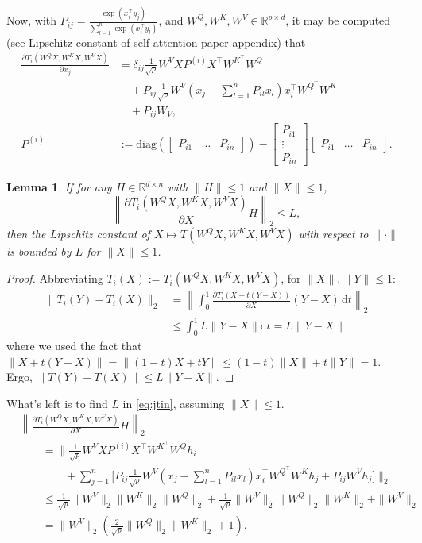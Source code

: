 \documentclass{article}
\newtheorem{lemma}{Lemma}
\begin{document}
Now, with $P_{ij} = \frac{\exp(x_i^\top y_j)}{\sum_{l=1}^n \exp(x_i^\top y_l)}$,
and $W^Q, W^K, W^V \in \mathbb R^{p\times d}$,
it may be computed (see Lipschitz constant of self attention paper appendix) that 
\begin{align*}
  \frac{\partial T_i(W^QX, W^KX, W^VX)}{\partial x_j}
  &= \delta_{ij}\frac1{\sqrt p} W^V X P^{(i)} X^\top W^{K^\top} W^Q\\
  &\quad + P_{ij}\frac1{\sqrt p}W^V (x_j - 
  \sum_{l=1}^n P_{il} x_l) x_i^\top W^{Q^\top} W^K\\
  &\quad + P_{ij}W_V, \\
  P^{(i)} &:= \mathrm{diag}\left(\begin{bmatrix} P_{i1} & \ldots & P_{in}
  \end{bmatrix}\right) - \begin{bmatrix} P_{i1} \\ \vdots \\ P_{in}\end{bmatrix}
    \begin{bmatrix}  P_{i1} & \ldots & P_{in}\end{bmatrix}.
\end{align*}
\begin{lemma}
  \label{lem:jaclip}
If for any $H\in\mathbb R^{d\times n}$ with $\|H\|\leq 1$ and
$\|X\|\leq 1$,
\begin{equation}
  \label{eq:jtin}
  \left\|\frac{\partial T_i(W^QX, W^KX, W^VX)}{\partial X} H\right\|_2 
  \leq L,
\end{equation}
then the Lipschitz constant of $X\mapsto T(W^QX, W^KX, W^VX)$ with respect to 
$\|\cdot\|$ is bounded by $L$ for $\|X\|\leq 1$.
\end{lemma}
\begin{proof}
Abbreviating $T_i(X) := T_i(W^QX, W^KX, W^VX)$, for $\|X\|, \|Y\|\leq 1$:
\begin{align*}
  \|T_i(Y) - T_i(X)\|_2 &= \left\|\int_{0}^1 \frac{\partial T_i(X + t(Y-X))}{
  \partial X}(Y-X)\,\mathrm dt\right\|_2 \\
  &\leq \int_0^1 L \|Y-X\| \mathrm dt = L \|Y-X\|
\end{align*}
where we used the fact that $\|X + t(Y-X)\| = \|(1-t)X + tY\| \leq (1-t)\|X\|
+t\|Y\| = 1$. Ergo, $\|T(Y) - T(X)\| \leq L\|Y-X\|$.
\end{proof}
What's left is to find $L$ in \eqref{eq:jtin}, assuming $\|X\|\leq 1$.
\begin{align*}
  &\left\|\frac{\partial T_i(W^Q X, W^KX, W^VX)}{\partial X}H\right\|_2 \\
  &\qquad=
  \bigg\|\frac1{\sqrt p}W^V XP^{(i)}X^\top
  W^{K^\top}W^Q h_i \\
  &\qquad\qquad+\sum_{j=1}^n\big[P_{ij} \frac1{\sqrt p}
  W^V(x_j - \sum_{l=1}^n P_{il}x_l)x_i^\top
  W^{Q^\top} W^Kh_j 
  + P_{ij}W^Vh_j\big]\bigg\|_2 \\
  &\qquad\leq\frac1{\sqrt p}\|W^V\|_2 \|W^K\|_2\|W^Q\|_2 + \frac 1{\sqrt p}
  \|W^V\|_2 \|W^Q\|_2 \|W^K\|_2 + \|W^V\|_2 \\
  &\qquad= \|W^V\|_2\left(\frac2{\sqrt p}\|W^Q\|_2\|W^K\|_2 + 1\right).
\end{align*}
\end{document}
